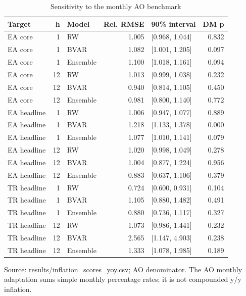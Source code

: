 \begin{table}[htbp]
\centering
\footnotesize
\caption{Sensitivity to the monthly AO benchmark}
\begin{tabularx}{\linewidth}{XrlrXr}
\toprule
Target & h & Model & Rel. RMSE & 90\% interval & DM p \\
\midrule
EA core & 1 & RW & 1.005 & [0.968, 1.044] & 0.832 \\
EA core & 1 & BVAR & 1.082 & [1.001, 1.205] & 0.097 \\
EA core & 1 & Ensemble & 1.100 & [1.018, 1.161] & 0.094 \\
EA core & 12 & RW & 1.013 & [0.999, 1.038] & 0.232 \\
EA core & 12 & BVAR & 0.940 & [0.814, 1.105] & 0.450 \\
EA core & 12 & Ensemble & 0.981 & [0.800, 1.140] & 0.772 \\
EA headline & 1 & RW & 1.006 & [0.947, 1.077] & 0.889 \\
EA headline & 1 & BVAR & 1.218 & [1.133, 1.378] & 0.000 \\
EA headline & 1 & Ensemble & 1.077 & [1.010, 1.141] & 0.079 \\
EA headline & 12 & RW & 1.020 & [0.998, 1.049] & 0.278 \\
EA headline & 12 & BVAR & 1.004 & [0.877, 1.224] & 0.956 \\
EA headline & 12 & Ensemble & 0.883 & [0.637, 1.106] & 0.379 \\
TR headline & 1 & RW & 0.724 & [0.600, 0.931] & 0.104 \\
TR headline & 1 & BVAR & 1.105 & [0.880, 1.482] & 0.491 \\
TR headline & 1 & Ensemble & 0.880 & [0.736, 1.117] & 0.327 \\
TR headline & 12 & RW & 1.073 & [0.986, 1.441] & 0.232 \\
TR headline & 12 & BVAR & 2.565 & [1.147, 4.903] & 0.238 \\
TR headline & 12 & Ensemble & 1.333 & [1.078, 1.985] & 0.189 \\
\bottomrule
\end{tabularx}
\par\vspace{3pt}\begin{minipage}{\linewidth}\footnotesize Source: results/inflation\_\allowbreak{}scores\_\allowbreak{}yoy.\allowbreak{}csv; AO denominator.\allowbreak{} The AO monthly adaptation sums simple monthly percentage rates; it is not compounded y/y inflation.\allowbreak{}\end{minipage}
\end{table}
